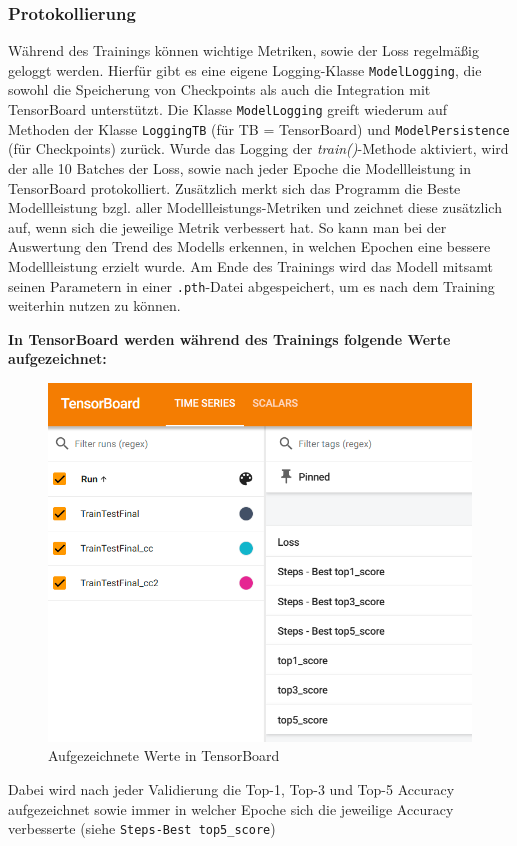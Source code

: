 \documentclass[12pt,oneside]{article}
\begin{document}
   		\subsubsection{Protokollierung}
		 Während des Trainings können wichtige Metriken, sowie der Loss regelmäßig geloggt werden. Hierfür gibt es eine eigene Logging-Klasse \texttt{ModelLogging}, die sowohl die Speicherung von Checkpoints als auch die Integration mit TensorBoard \cite{noauthor_tensorboard_nodate} unterstützt. Die Klasse \texttt{ModelLogging} greift wiederum auf Methoden der Klasse \texttt{LoggingTB} (für TB = TensorBoard) und \texttt{ModelPersistence} (für Checkpoints) zurück. Wurde das Logging der \textit{train()}-Methode aktiviert, wird der alle 10 Batches der Loss, sowie nach jeder Epoche die Modellleistung in TensorBoard protokolliert. Zusätzlich merkt sich das Programm die Beste Modellleistung bzgl. aller Modellleistungs-Metriken und zeichnet diese zusätzlich auf, wenn sich die jeweilige Metrik verbessert hat. So kann man bei der Auswertung den Trend des Modells erkennen, in welchen Epochen eine bessere Modellleistung erzielt wurde. Am Ende des Trainings wird das Modell mitsamt seinen Parametern in einer \texttt{.pth}-Datei abgespeichert, um es nach dem Training weiterhin nutzen zu können.
		 
		 
		 \textbf{In TensorBoard werden während des Trainings folgende Werte aufgezeichnet:}
		 \begin{figure}[h!]
		 	\centering
		 	\includegraphics[width=0.6\linewidth]{Bilder/TB_3.png}
		 	\caption[Aufgezeichnete Werte in TensorBoard]{Aufgezeichnete Werte in TensorBoard}
		 	\label{fig:TB3}
		 \end{figure}
		 
		 Dabei wird nach jeder Validierung die Top-1, Top-3 und Top-5 Accuracy aufgezeichnet sowie immer in welcher Epoche sich die jeweilige Accuracy verbesserte (siehe \texttt{Steps-Best top5\_score})
  
\end{document}
